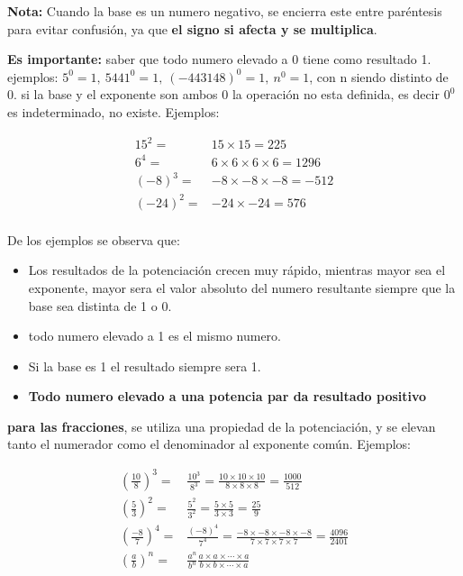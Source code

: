     \textbf{Nota:} Cuando la base es un numero negativo, se encierra este entre
    paréntesis para evitar confusión, ya que \textbf{el signo si afecta y se
    multiplica}.

    \textbf{Es importante: } saber que todo numero elevado a 0 tiene como resultado
    1. ejemplos: $5^0=1,\ 5441^0=1,\ (-443148)^0=1,\ n^0 = 1 $, con n siendo distinto de 0.
    si la base y el exponente son ambos 0 la operación no esta definida, es decir
    $0^0$ es indeterminado, no existe.
    Ejemplos:

    \begin{align*}
        15^2 =& 15\times15 = 225\\
        6^4 =& 6\times6\times6\times6 = 1296\\
        (-8)^3 =& -8\times-8\times-8 = -512\\
        (-24)^2 =& -24\times-24= 576\\
     \end{align*}

    De los ejemplos se observa que:
    \begin{itemize}
        \item Los resultados de la potenciación crecen muy rápido, mientras
            mayor sea  el exponente, mayor sera el valor absoluto del numero resultante
            siempre que la base sea distinta de 1 o 0.
        \item todo numero elevado a 1 es el mismo numero.
        \item Si la base es 1 el resultado siempre sera 1.
        \item \textbf{Todo numero elevado a una potencia par da resultado positivo}
    \end{itemize}

    \textbf{para las fracciones}, se utiliza una propiedad de la potenciación, y se
    elevan tanto el numerador como el denominador al exponente común. Ejemplos:

    \begin{align*}
        \left(\frac{10}{8}\right)^3=& \frac{10^3}{8^3} = \frac{10\times10\times10}{8\times8\times8} = \frac{1000}{512}\\
        \left(\frac{5}{3}\right)^{2} =& \frac{5^2}{3^2}= \frac{5\times5}{3\times3} = \frac{25}{9} \\
        \left(\frac{-8}{7}\right)^{4} =& \frac{(-8)^4}{7^4}= \frac{-8\times-8\times-8\times-8}{7\times7\times7\times7} = \frac{4096}{2401} \\
        \left(\frac{a}{b}\right)^{n} =& \frac{a^n}{b^n} \frac{a\times a\times \cdots\times a}{b\times b\times \cdots\times a}
     \end{align*}

